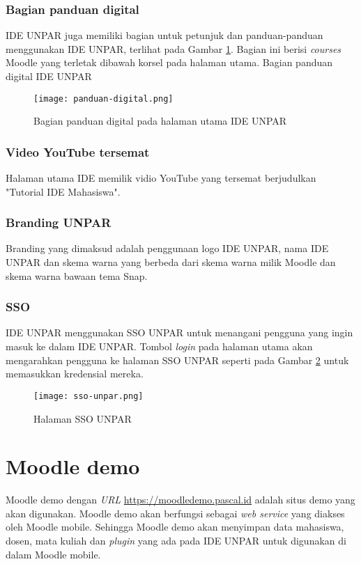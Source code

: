 \subsubsection {Bagian panduan digital}
IDE UNPAR juga memiliki bagian untuk petunjuk dan panduan-panduan menggunakan IDE UNPAR, terlihat pada Gambar \ref{fig:panduan-digital}. Bagian ini berisi \textit{courses} Moodle yang terletak dibawah korsel pada halaman utama. Bagian panduan digital IDE UNPAR 
\begin{figure}[H] 
	\centering  
	\texttt{[image: panduan-digital.png]}  
	\caption[Bagian panduan digital] {Bagian panduan digital pada halaman utama IDE UNPAR} 
	\label{fig:panduan-digital} 
\end{figure} 
\subsubsection {Video YouTube tersemat}
Halaman utama IDE memilik vidio YouTube yang tersemat berjudulkan "Tutorial IDE Mahasiswa".
\subsubsection {Branding UNPAR}
Branding yang dimaksud adalah penggunaan logo IDE UNPAR, nama IDE UNPAR dan skema warna yang berbeda dari skema warna milik Moodle dan skema warna bawaan tema Snap.
\subsubsection {SSO}
IDE UNPAR menggunakan SSO UNPAR untuk menangani pengguna yang ingin masuk ke dalam IDE UNPAR. Tombol \textit{login} pada halaman utama akan mengarahkan pengguna ke halaman SSO UNPAR seperti pada Gambar \ref{fig:sso-unpar} untuk memasukkan kredensial mereka.
\begin{figure}[H] 
	\centering  
	\texttt{[image: sso-unpar.png]}  
	\caption[Halaman SSO UNPAR] {Halaman SSO UNPAR} 
	\label{fig:sso-unpar} 
\end{figure} 


\section{Moodle demo}

Moodle demo dengan \textit{URL} \url{https://moodledemo.pascal.id} adalah situs demo yang akan digunakan. Moodle demo akan berfungsi sebagai \textit{web service} yang diakses oleh Moodle mobile. Sehingga Moodle demo akan menyimpan data mahasiswa, dosen, mata kuliah dan \textit{plugin} yang  ada pada IDE UNPAR untuk digunakan di dalam Moodle mobile. 
